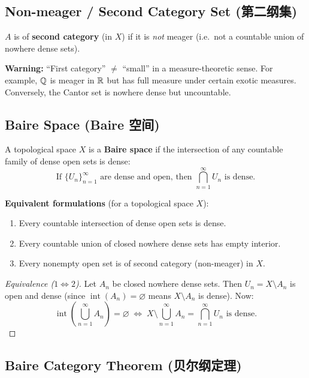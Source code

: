\documentclass{article}
\begin{document}
\subsection{Non-meager / Second Category Set (第二纲集)}\label{def:non-meager}
\begin{definition}
  $A$ is of \textbf{second category} (in $X$) if it is \emph{not} meager
  (i.e.\ not a countable union of nowhere dense sets).
\end{definition}

\textbf{Warning:} ``First category'' $\neq$ ``small'' in a measure-theoretic
sense. For example, $\mathbb{Q}$ is meager in $\mathbb{R}$ but has full measure under
certain exotic measures. Conversely, the Cantor set is nowhere dense but
uncountable.

\subsection{Baire Space (Baire 空间)}\label{def:baire-space}
\begin{definition}
  A topological space $X$ is a \textbf{Baire space} if the intersection
  of any countable family of dense open sets is dense:
  \[
    \text{If } \{U_n\}_{n=1}^\infty \text{ are dense and open, then }
    \bigcap_{n=1}^\infty U_n \text{ is dense.}
  \]
\end{definition}

\textbf{Equivalent formulations} (for a topological space $X$):
\begin{enumerate}
  \item Every countable intersection of dense open sets is dense.
  \item Every countable union of closed nowhere dense sets has empty interior.
  \item Every nonempty open set is of second category (non-meager) in $X$.
\end{enumerate}

\begin{proof}[Equivalence ($1 \Leftrightarrow 2$)]
  Let $A_n$ be closed nowhere dense sets. Then $U_n = X \setminus A_n$ is
  open and dense (since $\operatorname{int}(A_n) = \varnothing$ means
  $X \setminus A_n$ is dense). Now:
  \[
    \operatorname{int}\!\left(\bigcup_{n=1}^\infty A_n\right) = \varnothing
    \;\iff\;
    X \setminus \bigcup_{n=1}^\infty A_n = \bigcap_{n=1}^\infty U_n
    \text{ is dense.}
  \]
\end{proof}

\subsection{Baire Category Theorem (贝尔纲定理)}\label{thm:baire}
\end{document}
